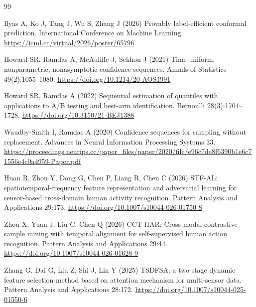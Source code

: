 \documentclass[pdflatex,sn-basic,Numbered,iicol]{sn-jnl}
\begin{document}
\begin{thebibliography}{99}
\begin{minipage}[t]{\linewidth}Ilyas A, Ko J, Tang J, Wu S, Zhang J (2026) Provably label-efficient conformal prediction. International Conference on Machine Learning. \url{https://icml.cc/virtual/2026/poster/65796}\end{minipage}

\begin{minipage}[t]{\linewidth}Howard SR, Ramdas A, McAuliffe J, Sekhon J (2021) Time-uniform, nonparametric, nonasymptotic confidence sequences. Annals of Statistics 49(2):1055--1080. \url{https://doi.org/10.1214/20-AOS1991}\end{minipage}

\begin{minipage}[t]{\linewidth}Howard SR, Ramdas A (2022) Sequential estimation of quantiles with applications to A/B testing and best-arm identification. Bernoulli 28(3):1704--1728. \url{https://doi.org/10.3150/21-BEJ1388}\end{minipage}

\begin{minipage}[t]{\linewidth}Waudby-Smith I, Ramdas A (2020) Confidence sequences for sampling without replacement. Advances in Neural Information Processing Systems 33. \url{https://proceedings.neurips.cc/paper_files/paper/2020/file/e96c7de8f6390b1e6c71556e4e0a4959-Paper.pdf}\end{minipage}

\begin{minipage}[t]{\linewidth}Huan R, Zhou Y, Dong G, Chen P, Liang R, Chen C (2026) STF-AL: spatiotemporal-frequency feature representation and adversarial learning for sensor-based cross-domain human activity recognition. Pattern Analysis and Applications 29:173. \url{https://doi.org/10.1007/s10044-026-01750-8}\end{minipage}

\begin{minipage}[t]{\linewidth}Zhou X, Yuan J, Liu C, Chen Q (2026) CCT-HAR: Cross-modal contrastive sample mining with temporal alignment for self-supervised human action recognition. Pattern Analysis and Applications 29:44. \url{https://doi.org/10.1007/s10044-026-01628-9}\end{minipage}

\begin{minipage}[t]{\linewidth}Zhang G, Dai G, Liu Z, Shi J, Lin Y (2025) TSDFSA: a two-stage dynamic feature selection method based on attention mechanism for multi-sensor data. Pattern Analysis and Applications 28:172. \url{https://doi.org/10.1007/s10044-025-01550-6}\end{minipage}


\end{thebibliography}
\end{document}
